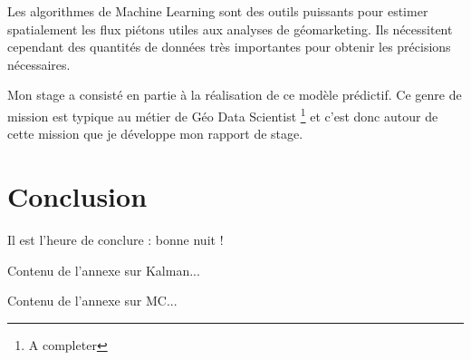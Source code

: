 \documentclass{themeensg}
\begin{document}
Les algorithmes de Machine Learning sont des outils puissants pour estimer spatialement les flux piétons utiles aux analyses de géomarketing. Ils nécessitent cependant des quantités de données très importantes pour obtenir les précisions nécessaires.

Mon stage a consisté en partie à la réalisation de ce modèle prédictif. Ce genre de mission est typique au métier de Géo Data Scientist \footnote{A completer} et c’est donc autour de cette mission que je développe mon rapport de stage.











\chapter*{Conclusion}
  \vspace{1.5cm}
Il est l'heure de conclure : bonne nuit !


\newevenpage
\printbibliography[title={Bibliographie}]
\nocite{*}

\newevenpage
\listoffigures

\newevenpage
\listoftables

\newevenpage
\begin{appendices} 
\label{beginappendices}
\label{annexekalman}
Contenu de l'annexe sur Kalman...

\label{annexemc}
Contenu de l'annexe sur MC...

\end{appendices} 
\end{document}
